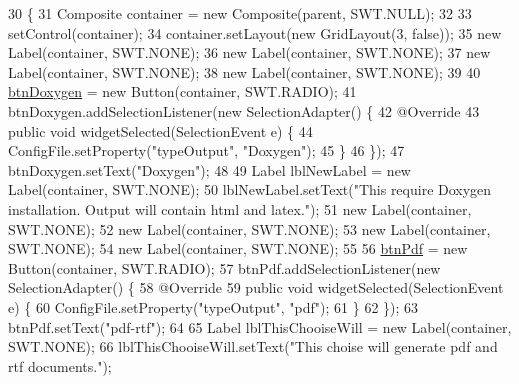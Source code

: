 \begin{DoxyCode}
30                                                 \{
31         Composite container = \textcolor{keyword}{new} Composite(parent, SWT.NULL);
32 
33         setControl(container);
34         container.setLayout(\textcolor{keyword}{new} GridLayout(3, \textcolor{keyword}{false}));
35         \textcolor{keyword}{new} Label(container, SWT.NONE);
36         \textcolor{keyword}{new} Label(container, SWT.NONE);
37         \textcolor{keyword}{new} Label(container, SWT.NONE);
38         \textcolor{keyword}{new} Label(container, SWT.NONE);
39         
40         \hyperlink{classit_1_1isislab_1_1masonassisteddocumentation_1_1mason_1_1wizards_1_1_a1___choose_output_a64285d7a7afd8d13b8da8dfc76d8c524}{btnDoxygen} = \textcolor{keyword}{new} Button(container, SWT.RADIO);
41         btnDoxygen.addSelectionListener(\textcolor{keyword}{new} SelectionAdapter() \{
42             @Override
43             \textcolor{keyword}{public} \textcolor{keywordtype}{void} widgetSelected(SelectionEvent e) \{
44                 ConfigFile.setProperty(\textcolor{stringliteral}{"typeOutput"}, \textcolor{stringliteral}{"Doxygen"});
45             \}
46         \});
47         btnDoxygen.setText(\textcolor{stringliteral}{"Doxygen"});
48         
49         Label lblNewLabel = \textcolor{keyword}{new} Label(container, SWT.NONE);
50         lblNewLabel.setText(\textcolor{stringliteral}{"This require Doxygen installation. Output will contain html and latex."});
51         \textcolor{keyword}{new} Label(container, SWT.NONE);
52         \textcolor{keyword}{new} Label(container, SWT.NONE);
53         \textcolor{keyword}{new} Label(container, SWT.NONE);
54         \textcolor{keyword}{new} Label(container, SWT.NONE);
55         
56         \hyperlink{classit_1_1isislab_1_1masonassisteddocumentation_1_1mason_1_1wizards_1_1_a1___choose_output_a9b810d24e36dd0e722f76a0f0a9b064b}{btnPdf} = \textcolor{keyword}{new} Button(container, SWT.RADIO);
57         btnPdf.addSelectionListener(\textcolor{keyword}{new} SelectionAdapter() \{
58             @Override
59             \textcolor{keyword}{public} \textcolor{keywordtype}{void} widgetSelected(SelectionEvent e) \{
60                 ConfigFile.setProperty(\textcolor{stringliteral}{"typeOutput"}, \textcolor{stringliteral}{"pdf"});
61             \}
62         \});
63         btnPdf.setText(\textcolor{stringliteral}{"pdf-rtf"});
64         
65         Label lblThisChooiseWill = \textcolor{keyword}{new} Label(container, SWT.NONE);
66         lblThisChooiseWill.setText(\textcolor{stringliteral}{"This choise will generate pdf and rtf documents."});

\end{DoxyCode}
